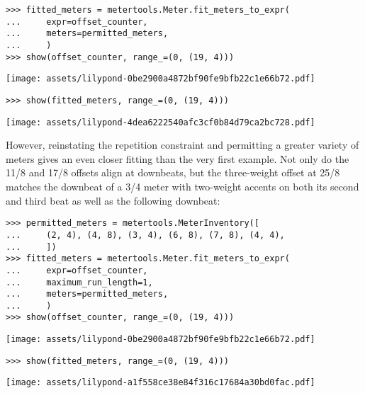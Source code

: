 \begin{abjadbookoutput}
\begin{singlespacing}
\vspace{-0.5\baselineskip}
\begin{lstlisting}
>>> fitted_meters = metertools.Meter.fit_meters_to_expr(
...     expr=offset_counter,
...     meters=permitted_meters,
...     )
>>> show(offset_counter, range_=(0, (19, 4)))
\end{lstlisting}
\noindent\texttt{[image: assets/lilypond-0be2900a4872bf90fe9bfb22c1e66b72.pdf]}
\begin{lstlisting}
>>> show(fitted_meters, range_=(0, (19, 4)))
\end{lstlisting}
\noindent\texttt{[image: assets/lilypond-4dea6222540afc3cf0b84d79ca2bc728.pdf]}
\end{singlespacing}
\end{abjadbookoutput}

\noindent However, reinstating the repetition constraint and permitting a
greater variety of meters gives an even closer fitting than the very first
example. Not only do the 11/8 and 17/8 offsets align at downbeats, but the
three-weight offset at 25/8 matches the downbeat of a 3/4 meter with two-weight
accents on both its second and third beat as well as the following downbeat:

\begin{comment}
<abjad>
permitted_meters = metertools.MeterInventory([
    (2, 4), (4, 8), (3, 4), (6, 8), (7, 8), (4, 4),
    ])
fitted_meters = metertools.Meter.fit_meters_to_expr(
    expr=offset_counter,
    maximum_run_length=1,
    meters=permitted_meters,
    )
show(offset_counter, range_=(0, (19, 4)))
show(fitted_meters, range_=(0, (19, 4)))
</abjad>
\end{comment}

\begin{abjadbookoutput}
\begin{singlespacing}
\vspace{-0.5\baselineskip}
\begin{lstlisting}
>>> permitted_meters = metertools.MeterInventory([
...     (2, 4), (4, 8), (3, 4), (6, 8), (7, 8), (4, 4),
...     ])
>>> fitted_meters = metertools.Meter.fit_meters_to_expr(
...     expr=offset_counter,
...     maximum_run_length=1,
...     meters=permitted_meters,
...     )
>>> show(offset_counter, range_=(0, (19, 4)))
\end{lstlisting}
\noindent\texttt{[image: assets/lilypond-0be2900a4872bf90fe9bfb22c1e66b72.pdf]}
\begin{lstlisting}
>>> show(fitted_meters, range_=(0, (19, 4)))
\end{lstlisting}
\noindent\texttt{[image: assets/lilypond-a1f558ce38e84f316c17684a30bd0fac.pdf]}
\end{singlespacing}
\end{abjadbookoutput}

